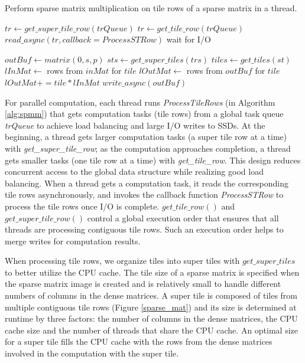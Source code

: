 \begin{algorithm}
	\caption{Perform sparse matrix multiplication on tile rows of a sparse
	matrix in a thread.}
	\label{alg:spmm}
	\begin{algorithmic}[1]
		 
		\State $tr \gets get\_super\_tile\_row(trQueue)$
		\Else \State $tr \gets get\_tile\_row(trQueue)$
		\EndIf
		\State $read\_async(tr, callback=ProcessSTRow)$
		 \State wait for I/O
		\EndIf
		\EndWhile
		\EndProcedure

		\State

		 
		 
		\State $outBuf \gets matrix(0, s, p)$
		\State $sts \gets get\_super\_tiles(trs)$
		\State $tiles \gets get\_tiles(st)$
		\State $lInMat \gets$ rows from $inMat$ for $tile$
		\State $lOutMat \gets$ rows from $outBuf$ for $tile$
		\State $lOutMat += tile * lInMat$
		\EndFor
		\EndFor
		\State $write\_async(outBuf)$
		\EndProcedure
	\end{algorithmic}
\end{algorithm}

For parallel computation, each thread runs \textit{ProcessTileRows} (in Algorithm
\ref{alg:spmm}) that gets computation tasks (tile rows) from a global task queue
\textit{trQueue} to achieve load balancing and large I/O writes to SSDs.
At the beginning, a thread gets larger computation tasks (a super tile row at
a time) with \textit{get\_super\_tile\_row}; as the computation approaches
completion, a thread gets smaller tasks (one tile row at a time) with
\textit{get\_tile\_row}. This design reduces concurrent access to
the global data structure while realizing good load balancing. When a thread
gets a computation task, it reads the corresponding tile rows asynchronously,
and invokes the callback function \textit{ProcessSTRow} to process the tile rows
once I/O is complete. $get\_tile\_row()$ and $get\_super\_tile\_row()$ control
a global execution order that ensures that all threads are processing contiguous
tile rows. Such an execution order helps to merge writes for computation results.

When processing tile rows, we organize tiles into super tiles with
$get\_super\_tiles$ to better utilize the CPU cache. The tile size of a sparse
matrix is specified when the sparse matrix image is created and is relatively
small to handle different numbers of columns in the dense matrices. A super tile
is composed of tiles from multiple contiguous tile rows (Figure \ref{sparse_mat})
and its size is determined at runtime by three factors: the number of columns
in the dense matrices, the CPU cache size and the number of threads that
share the CPU cache. An optimal size for a super tile fills
the CPU cache with the rows from the dense matrices involved in
the computation with the super tile.

